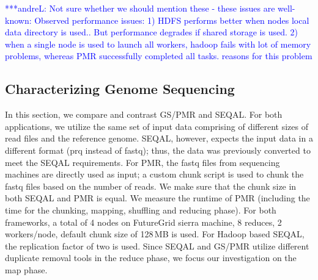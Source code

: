 \documentclass{acm_proc_article-sp}
\newcommand{\alnote}[1]{ {\textcolor{blue} { ***andreL: #1 }}}
\newcommand{\pnote}[1]{ {\textcolor{magenta} { ***pradeep: #1 }}}
\newcommand{\alnote}[1]{}
\newcommand{\pnote}[1]{}
\begin{document}




\alnote{Not sure whether we should mention these - these issues are well-known: Observed performance issues:
1) HDFS performs better when nodes local data directory is used.. But performance degrades if shared storage is used. 			
2) when a single node is used to launch all workers, hadoop fails with lot of memory problems, whereas PMR successfully completed all tasks.			
reasons for this problem}


\subsection{Characterizing Genome Sequencing}

In this section, we compare and contrast GS/PMR and SEQAL. For both
applications, we utilize the same set of input data comprising of different
sizes of read files and the reference genome. SEQAL, however, expects the input
data in a different format (prq instead of fastq); thus, the data was previously
converted to meet the SEQAL requirements. For PMR, the fastq files from 
sequencing machines are directly used as input; a custom chunk script is used to
chunk the fastq files based on the number of reads. We make sure that the chunk
size in both SEQAL and PMR is equal. We measure the runtime of PMR (including
the time for the chunking, mapping, shuffling and reducing phase). For both
frameworks, a total of 4 nodes on FutureGrid sierra machine, 8 reduces, 2
workers/node, default chunk size of 128\,MB is used. For Hadoop based SEQAL, the
replication factor of two is used. Since SEQAL and GS/PMR utilize different
duplicate removal tools in the reduce phase, we focus our investigation on the
map phase.
\end{document}
